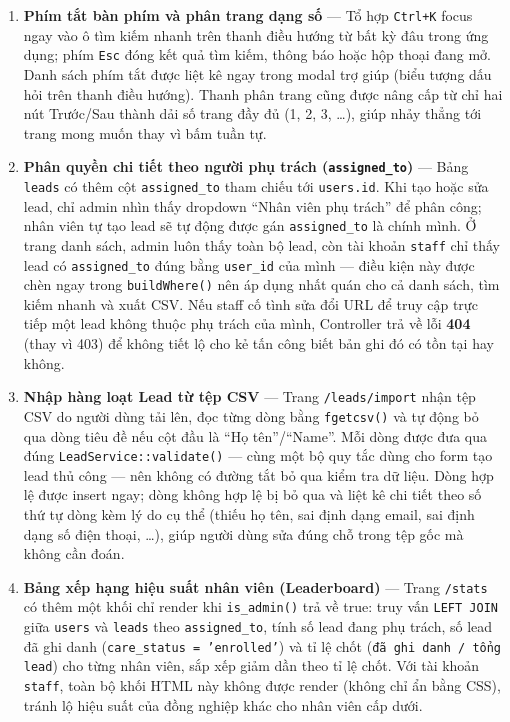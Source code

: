 \begin{enumerate}[label = \textbf{\arabic*.}, leftmargin = 0.5cm]
    \item \textbf{Phím tắt bàn phím và phân trang dạng số} — Tổ hợp \texttt{Ctrl+K} focus ngay vào ô tìm kiếm nhanh trên thanh điều hướng từ bất kỳ đâu trong ứng dụng; phím \texttt{Esc} đóng kết quả tìm kiếm, thông báo hoặc hộp thoại đang mở. Danh sách phím tắt được liệt kê ngay trong modal trợ giúp (biểu tượng dấu hỏi trên thanh điều hướng). Thanh phân trang cũng được nâng cấp từ chỉ hai nút Trước/Sau thành dải số trang đầy đủ (1, 2, 3, \ldots), giúp nhảy thẳng tới trang mong muốn thay vì bấm tuần tự.

    \item \textbf{Phân quyền chi tiết theo người phụ trách (\texttt{assigned\_to})} — Bảng \texttt{leads} có thêm cột \texttt{assigned\_to} tham chiếu tới \texttt{users.id}. Khi tạo hoặc sửa lead, chỉ admin nhìn thấy dropdown ``Nhân viên phụ trách'' để phân công; nhân viên tự tạo lead sẽ tự động được gán \texttt{assigned\_to} là chính mình. Ở trang danh sách, admin luôn thấy toàn bộ lead, còn tài khoản \texttt{staff} chỉ thấy lead có \texttt{assigned\_to} đúng bằng \texttt{user\_id} của mình — điều kiện này được chèn ngay trong \texttt{buildWhere()} nên áp dụng nhất quán cho cả danh sách, tìm kiếm nhanh và xuất CSV. Nếu staff cố tình sửa đổi URL để truy cập trực tiếp một lead không thuộc phụ trách của mình, Controller trả về lỗi \textbf{404} (thay vì 403) để không tiết lộ cho kẻ tấn công biết bản ghi đó có tồn tại hay không.

    \item \textbf{Nhập hàng loạt Lead từ tệp CSV} — Trang \texttt{/leads/import} nhận tệp CSV do người dùng tải lên, đọc từng dòng bằng \texttt{fgetcsv()} và tự động bỏ qua dòng tiêu đề nếu cột đầu là ``Họ tên''/``Name''. Mỗi dòng được đưa qua đúng \texttt{LeadService::validate()} — cùng một bộ quy tắc dùng cho form tạo lead thủ công — nên không có đường tắt bỏ qua kiểm tra dữ liệu. Dòng hợp lệ được insert ngay; dòng không hợp lệ bị bỏ qua và liệt kê chi tiết theo số thứ tự dòng kèm lý do cụ thể (thiếu họ tên, sai định dạng email, sai định dạng số điện thoại, \ldots), giúp người dùng sửa đúng chỗ trong tệp gốc mà không cần đoán.

    \item \textbf{Bảng xếp hạng hiệu suất nhân viên (Leaderboard)} — Trang \texttt{/stats} có thêm một khối chỉ render khi \texttt{is\_admin()} trả về true: truy vấn \texttt{LEFT JOIN} giữa \texttt{users} và \texttt{leads} theo \texttt{assigned\_to}, tính số lead đang phụ trách, số lead đã ghi danh (\texttt{care\_status = 'enrolled'}) và tỉ lệ chốt (\texttt{đã ghi danh / tổng lead}) cho từng nhân viên, sắp xếp giảm dần theo tỉ lệ chốt. Với tài khoản \texttt{staff}, toàn bộ khối HTML này không được render (không chỉ ẩn bằng CSS), tránh lộ hiệu suất của đồng nghiệp khác cho nhân viên cấp dưới.


\end{enumerate}
